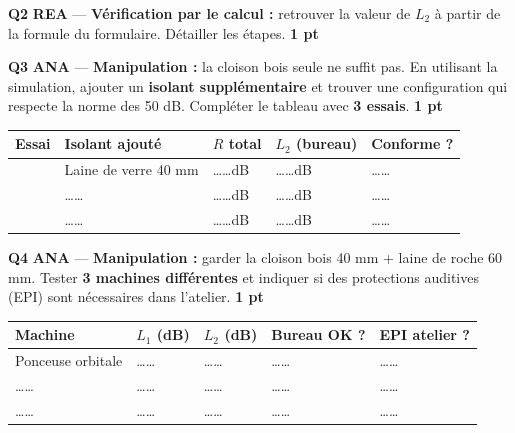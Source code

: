 \documentclass[a4paper,11pt]{article}
\newcommand{\pts}[1]{\hfill\textcolor{gris}{\small\textbf{#1}}}
\newcommand{\comp}[1]{\colorbox{blue!10}{\scriptsize\textbf{#1}}}
\begin{document}
\textbf{Q2} \comp{REA} — \textbf{Vérification par le calcul :} retrouver la valeur de $L_2$ à partir de la formule du formulaire. Détailler les étapes. \pts{1 pt}

\begin{reponsebox}[3cm]
\dotfill

\dotfill

\dotfill
\end{reponsebox}

\textbf{Q3} \comp{ANA} — \textbf{Manipulation :} la cloison bois seule ne suffit pas. En utilisant la simulation, ajouter un \textbf{isolant supplémentaire} et trouver une configuration qui respecte la norme des 50 dB. Compléter le tableau avec \textbf{3 essais}. \pts{1 pt}

\begin{center}
\renewcommand{\arraystretch}{1.8}
\begin{tabular}{|>{\centering\arraybackslash}m{1.2cm}|>{\centering\arraybackslash}m{3.5cm}|>{\centering\arraybackslash}m{2.2cm}|>{\centering\arraybackslash}m{2.2cm}|>{\centering\arraybackslash}m{2.2cm}|}
\hline
\textbf{Essai} & \textbf{Isolant ajouté} & \textbf{$R$ total} & \textbf{$L_2$ (bureau)} & \textbf{Conforme ?} \\
\hline
1 & Laine de verre 40 mm & \ldots\ldots dB & \ldots\ldots dB & \ldots\ldots \\
\hline
2 & \ldots\ldots & \ldots\ldots dB & \ldots\ldots dB & \ldots\ldots \\
\hline
3 & \ldots\ldots & \ldots\ldots dB & \ldots\ldots dB & \ldots\ldots \\
\hline
\end{tabular}
\renewcommand{\arraystretch}{1}
\end{center}

\textbf{Q4} \comp{ANA} — \textbf{Manipulation :} garder la cloison bois 40 mm + laine de roche 60 mm. Tester \textbf{3 machines différentes} et indiquer si des protections auditives (EPI) sont nécessaires dans l'atelier. \pts{1 pt}

\begin{center}
\renewcommand{\arraystretch}{1.8}
\begin{tabular}{|>{\centering\arraybackslash}m{3.5cm}|>{\centering\arraybackslash}m{2cm}|>{\centering\arraybackslash}m{2cm}|>{\centering\arraybackslash}m{2cm}|>{\centering\arraybackslash}m{2cm}|}
\hline
\textbf{Machine} & \textbf{$L_1$ (dB)} & \textbf{$L_2$ (dB)} & \textbf{Bureau OK ?} & \textbf{EPI atelier ?} \\
\hline
Ponceuse orbitale & \ldots\ldots & \ldots\ldots & \ldots\ldots & \ldots\ldots \\
\hline
\ldots\ldots & \ldots\ldots & \ldots\ldots & \ldots\ldots & \ldots\ldots \\
\hline
\ldots\ldots & \ldots\ldots & \ldots\ldots & \ldots\ldots & \ldots\ldots \\
\hline
\end{tabular}
\renewcommand{\arraystretch}{1}
\end{center}
\end{document}

